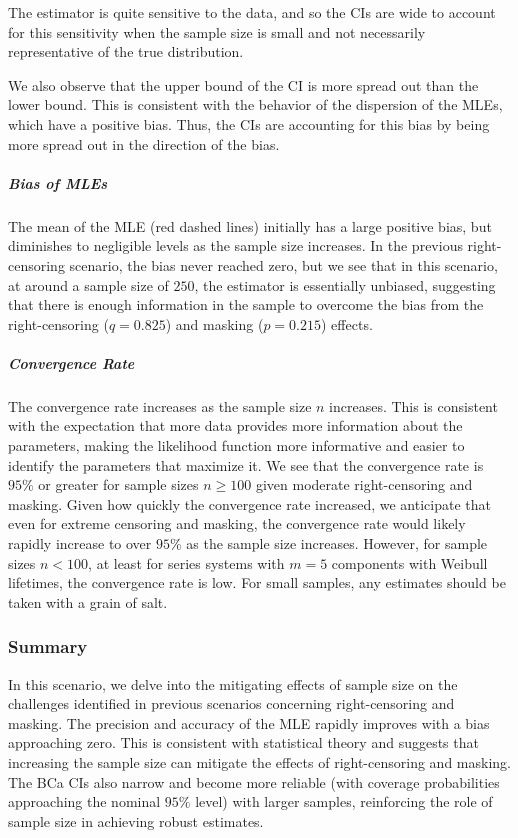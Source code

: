 \documentclass[
]{article}
\theoremstyle{definition}
\theoremstyle{plain}
\theoremstyle{definition}
\theoremstyle{definition}
\theoremstyle{definition}
\theoremstyle{definition}
\theoremstyle{remark}
\begin{document}
The estimator is quite sensitive to the data, and so the CIs are wide to account
for this sensitivity when the sample size is small and not necessarily
representative of the true distribution.

We also observe that the upper bound of the CI is more spread out than the lower
bound. This is consistent with the behavior of the dispersion of the MLEs, which
have a positive bias. Thus, the CIs are accounting for this bias by being
more spread out in the direction of the bias.

\hypertarget{bias-of-mles-2}{%
\subparagraph*{Bias of MLEs}\label{bias-of-mles-2}}

The mean of the MLE (red dashed lines) initially has a large positive
bias, but diminishes to negligible levels as the sample size increases. In the
previous right-censoring scenario, the bias never reached zero, but we see that
in this scenario, at around a sample size of \(250\), the estimator is essentially
unbiased, suggesting that there is enough information in the sample to overcome
the bias from the right-censoring (\(q = 0.825\)) and masking (\(p = 0.215\))
effects.

\hypertarget{convergence-rate-2}{%
\subparagraph*{Convergence Rate}\label{convergence-rate-2}}

The convergence rate increases as the sample size \(n\) increases. This is
consistent with the expectation that more data provides more information about
the parameters, making the likelihood function more informative and easier to
identify the parameters that maximize it. We see that the convergence rate is
\(95\%\) or greater for sample sizes \(n \geq 100\) given moderate right-censoring
and masking. Given how quickly the convergence rate increased, we anticipate
that even for extreme censoring and masking, the convergence rate would likely
rapidly increase to over \(95\%\) as the sample size increases. However, for
sample sizes \(n < 100\), at least for series systems with \(m = 5\) components with
Weibull lifetimes, the convergence rate is low. For small samples, any estimates
should be taken with a grain of salt.

\hypertarget{summary-2}{%
\subsubsection{Summary}\label{summary-2}}

In this scenario, we delve into the mitigating effects of sample size on the
challenges identified in previous scenarios concerning right-censoring and
masking. The precision and accuracy of the MLE rapidly improves with a bias
approaching zero. This is consistent with statistical theory and suggests that
increasing the sample size can mitigate the effects of right-censoring and
masking. The BCa CIs also narrow and become more reliable (with coverage
probabilities approaching the nominal \(95\%\) level) with larger samples,
reinforcing the role of sample size in achieving robust estimates.
\end{document}
